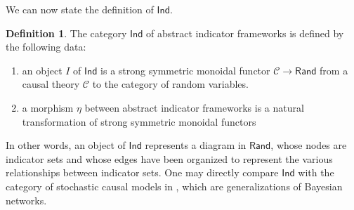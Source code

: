 \documentclass{article}
\theoremstyle{definition}
\newtheorem{definition}[theorem]{Definition}
\newcommand{\Cat}[1]{\mathsf{#1}}
\def\Ind{\Cat{Ind}}
\def\Rand{\Cat{Rand}}
\def\Cor{\textnormal{Cor}}
\begin{document}
We can now state the definition of $\Ind$.

\begin{definition}The category $\Ind$ of abstract indicator frameworks is defined by the following data:
\begin{enumerate}
\item an object $I$ of $\Ind$ is a strong symmetric monoidal functor $\mathcal{C} \to \Rand$ from a causal theory $\mathcal{C}$ to the category of random variables.
\item a morphism $\eta$ between abstract indicator frameworks is a natural transformation of strong symmetric monoidal functors
\end{enumerate}
\end{definition}

In other words, an object of $\Ind$ represents a diagram in $\Rand$, whose nodes are indicator sets and whose edges have been organized to represent the various relationships between indicator sets. One may directly compare $\Ind$ with the category of stochastic causal models in \cite{fong13}, which are generalizations of Bayesian networks.
\end{document}
